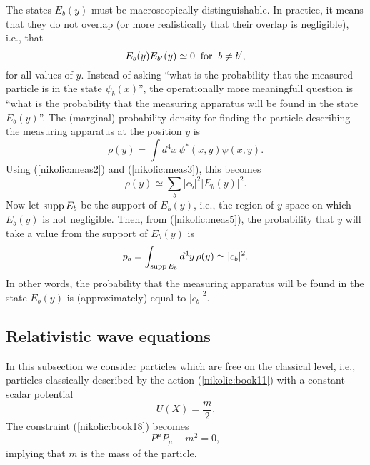 \documentclass[12pt,twoside]{report} %
\begin{document}
The states $E_b(y)$ must be macroscopically distinguishable. In practice, it means
that they do not overlap (or more realistically that their overlap is negligible), i.e., that
\begin{equation}\label{nikolic:meas3}
E_b(y) E_{b'}(y) \simeq 0 \;\; {\rm for} \;\; b \neq b' ,
\end{equation}
for all values of $y$. Instead of asking ``what is the probability that the measured particle
is in the state $\psi_b(x)$'', the operationally more meaningfull question is
``what is the probability that the measuring apparatus will be found
in the state $E_b(y)$''. The (marginal) probability density for finding the particle describing 
the measuring apparatus at the position $y$ is
\begin{equation}\label{nikolic:meas4}
 \rho(y)=\int d^4x \, \psi^*(x,y)\psi(x,y) .
\end{equation}
Using (\ref{nikolic:meas2}) and (\ref{nikolic:meas3}), this becomes
\begin{equation}\label{nikolic:meas5}
 \rho(y) \simeq \sum_b |c_b|^2 |E_b(y)|^2 .
\end{equation}
Now let ${\rm supp}\,E_b$ be the support of $E_b(y)$, i.e., the region of 
$y$-space on which $E_b(y)$ is not negligible. 
Then, from (\ref{nikolic:meas5}), the probability that $y$ will take a value from the
support of $E_b(y)$ is
\begin{equation}\label{nikolic:meas6}
 p_b=\int_{{\rm supp}\,E_b} d^4y \, \rho(y) \simeq  |c_b|^2 .
\end{equation}
In other words, the probability that the measuring apparatus will be found
in the state $E_b(y)$ is (approximately) equal to $|c_b|^2$. 


\subsection{Relativistic wave equations}

In this subsection we consider particles which are free on the classical level,
i.e., particles classically described by the action (\ref{nikolic:book11})
with a constant scalar potential
\begin{equation}\label{nikolic:u=m/2}
 U(X)=\frac{m}{2} .
\end{equation}
The constraint (\ref{nikolic:book18}) becomes
\begin{equation}\label{nikolic:consc}
 P^{\mu}P_{\mu}-m^2 =0 ,
\end{equation}
implying that $m$ is the mass of the particle.
\end{document}
